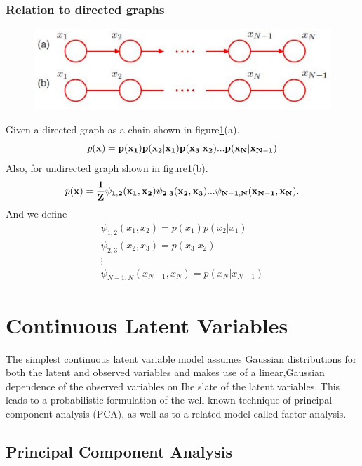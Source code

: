 \documentclass[a4paper]{book}
\begin{document}
\subsubsection{Relation to directed graphs}
\begin{figure}
  \centering
  \includegraphics[width=\textwidth]{./imgs/GM3.eps}
  \caption{}\label{GM3}
\end{figure}
Given a directed graph as a chain shown in figure\ref{GM3}(a).
\begin{equation}\label{eq8.14}
  p(\bf x) =p(x_1)p(x_2|x_1)p(x_3|x_2)...p(x_N|x_{N-1})
\end{equation}
Also, for undirected graph shown in figure\ref{GM3}(b).
\begin{equation}\label{eq8.15}
  p(\bf x) = \frac{1}{Z}\psi_{1,2}(x_1,x_2)\psi_{2,3}(x_2,x_3)...\psi_{N-1,N}(x_{N-1},x_N).
\end{equation}
And we define
\begin{align}\label{eq8.15}
  \psi_{1,2}(x_1,x_2) = p(x_1)p(x_2|x_1) \\
  \psi_{2,3}(x_2,x_3)=p(x_3|x_2) \\
  \vdots \\
  \psi_{N-1,N}(x_{N-1},x_N) = p(x_N|x_{N-1})
\end{align}






\section{Continuous Latent Variables}
The simplest continuous latent variable model assumes Gaussian distributions
for both the latent and observed variables and makes use of a linear,Gaussian dependence of the observed variables on Ihe slate of the latent variables. This leads
to a probabilistic formulation of the well-known technique of principal component
analysis (PCA), as well as to a related model called factor analysis.
\subsection{Principal Component Analysis}
\end{document}

